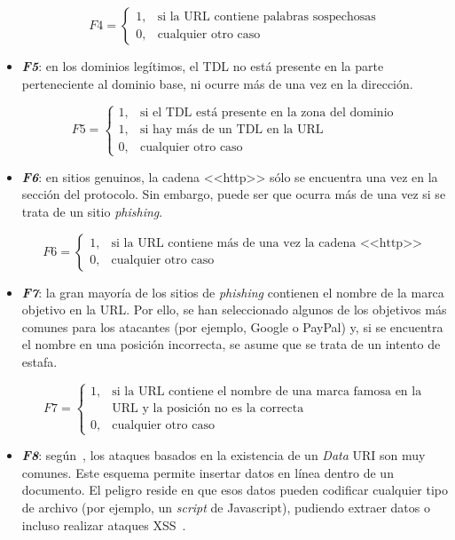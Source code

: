 \begin{itemize}
	\[F4 = \left\{ \begin{array}{lr} 1, & \text{si la URL contiene palabras sospechosas}\\ 
	0, & \text{cualquier otro caso} \label{eqn:phishing_f4} \end{array} \right. \]

	\item \textit{\textbf{F5}}: en los dominios legítimos, el TDL no está presente en la parte perteneciente al dominio base, ni ocurre más de una vez en la dirección.
	
	\[F5 = \left\{ \begin{array}{lr} 1, & \text{si el TDL está presente en la zona del dominio}\\ 
	1, & \text{si hay más de un TDL en la URL} \\
	0, & \text{cualquier otro caso} \label{eqn:phishing_f5} \end{array} \right. \]
	
	
	\item \textit{\textbf{F6}}: en sitios genuinos, la cadena <<http>> sólo se encuentra una vez en la sección del protocolo. Sin embargo, puede ser que ocurra más de una vez si se trata de un sitio \textit{phishing}.
	
	\[F6 = \left\{ \begin{array}{lr} 1, & \text{si la URL contiene más de una vez la cadena <<http>>}\\ 
	0, & \text{cualquier otro caso} \label{eqn:phishing_f6} \end{array} \right. \]

	\item \textit{\textbf{F7}}: la gran mayoría de los sitios de \textit{phishing} contienen el nombre de la marca objetivo en la URL. Por ello, se han seleccionado algunos de los objetivos más comunes para los atacantes (por ejemplo, Google o PayPal) y, si se encuentra el nombre en una posición incorrecta, se asume que se trata de un intento de estafa.
	
	\[F7 = \left\{ \begin{array}{lr} 1, & \text{si la URL contiene el nombre de una marca famosa en la}\\ & \text{URL y la posición no es la correcta}\\ 
	0, & \text{cualquier otro caso} \label{eqn:phishing_f7} \end{array} \right. \]
	
	\item \textit{\textbf{F8}}: según~\cite{featuresPhishing2018Gupta}, los ataques basados en la existencia de un \textit{Data} URI son muy comunes. Este esquema permite insertar datos en línea dentro de un documento. El peligro reside en que esos datos pueden codificar cualquier tipo de archivo (por ejemplo, un \textit{script} de Javascript), pudiendo extraer datos o incluso realizar ataques XSS~\cite{dataUri2020neoguias}. 
	

\end{itemize}
